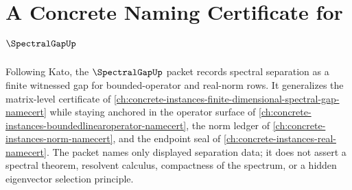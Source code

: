 \chapter{A Concrete Naming Certificate for $\SpectralGapUp$}
\label{ch:concrete-instances-spectral-gap-namecert}

Following Kato, the $\SpectralGapUp$ packet records spectral separation as a finite witnessed gap for bounded-operator and real-norm rows. It generalizes the matrix-level certificate of \autoref{ch:concrete-instances-finite-dimensional-spectral-gap-namecert} while staying anchored in the operator surface of \autoref{ch:concrete-instances-boundedlinearoperator-namecert}, the norm ledger of \autoref{ch:concrete-instances-norm-namecert}, and the endpoint seal of \autoref{ch:concrete-instances-real-namecert}. The packet names only displayed separation data; it does not assert a spectral theorem, resolvent calculus, compactness of the spectrum, or a hidden eigenvector selection principle.

